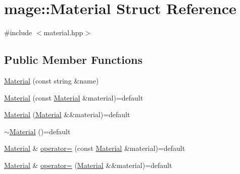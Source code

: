 \hypertarget{structmage_1_1_material}{}\section{mage\+:\+:Material Struct Reference}
\label{structmage_1_1_material}


{\ttfamily \#include $<$material.\+hpp$>$}

\subsection*{Public Member Functions}
\begin{DoxyCompactItemize}
\item 
\hyperlink{structmage_1_1_material_a0307d3bcf53c6ba270c8be4d127298db}{Material} (const string \&name)
\item 
\hyperlink{structmage_1_1_material_abed630412cdc4a6281389d128ec4b5f3}{Material} (const \hyperlink{structmage_1_1_material}{Material} \&material)=default
\item 
\hyperlink{structmage_1_1_material_a41bfbc2bfa16e3694ac443d390b804c2}{Material} (\hyperlink{structmage_1_1_material}{Material} \&\&material)=default
\item 
\hyperlink{structmage_1_1_material_a4ca65b7e24144ee08dd1ce8d0eda9284}{$\sim$\+Material} ()=default
\item 
\hyperlink{structmage_1_1_material}{Material} \& \hyperlink{structmage_1_1_material_a7ebc9986924ca13ae8468005518dcfc7}{operator=} (const \hyperlink{structmage_1_1_material}{Material} \&material)=default
\item 
\hyperlink{structmage_1_1_material}{Material} \& \hyperlink{structmage_1_1_material_a500a2ebe99d4d7b3be5bf57b6bff62a1}{operator=} (\hyperlink{structmage_1_1_material}{Material} \&\&material)=default
\end{DoxyCompactItemize}
